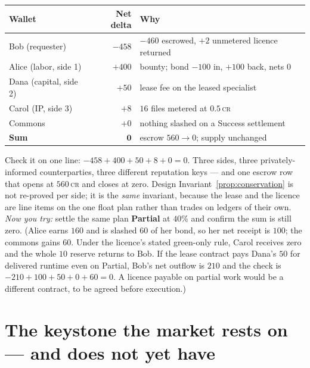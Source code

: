 \documentclass[11pt,a4paper]{article}
\theoremstyle{definition}
\theoremstyle{definition}
\theoremstyle{remark}
\begin{document}
\begin{center}\small
\begin{tabularx}{\textwidth}{@{}>{\raggedright\arraybackslash}p{4.0cm} r >{\raggedright\arraybackslash}X@{}}
\toprule
\textbf{Wallet} & \textbf{Net delta} & \textbf{Why} \\
\midrule
Bob (requester)      & $-458$ & $-460$ escrowed, $+2$ unmetered licence returned \\
Alice (labor, side 1)& $+400$ & bounty; bond $-100$ in, $+100$ back, nets $0$ \\
Dana (capital, side 2)& $+50$ & lease fee on the leased specialist \\
Carol (IP, side 3)   & $+8$   & $16$ files metered at $0.5$\,\textsc{cr} \\
Commons              & $+0$   & nothing slashed on a Success settlement \\
\midrule
\textbf{Sum}         & $\mathbf{0}$ & escrow $560 \to 0$; supply unchanged \\
\bottomrule
\end{tabularx}
\end{center}

\noindent Check it on one line: $-458 + 400 + 50 + 8 + 0 = 0$. Three sides, three
privately-informed counterparties, three different reputation keys --- and one
escrow row that opens at $560$\,\textsc{cr} and closes at zero.
Design Invariant~\ref{prop:conservation} is not re-proved per side; it is the \emph{same}
invariant, because the lease and the licence are line items on the one float plan
rather than trades on ledgers of their own. \emph{Now you try:} settle the same plan
\textbf{Partial} at $40\%$ and confirm the sum is still zero. (Alice earns $160$ and
is slashed $60$ of her bond, so her net receipt is $100$; the commons gains
$60$. Under the licence's stated green-only rule, Carol receives zero and the
whole $10$ reserve returns to Bob. If the lease contract pays Dana's $50$
for delivered runtime even on Partial, Bob's net outflow is $210$ and the check
is $-210+100+50+0+60=0$. A licence payable on partial work would be a different
contract, to be agreed before execution.)

\pdexercisepointer{\ref{ex:he-grossman-hart-roles}}{\ref{ex:he-deontic-conflict-checker}}{\pageref{ex:he-grossman-hart-roles}}

\section{The keystone the market rests on --- and does not yet have}\label{sec:keystone}
\end{document}
